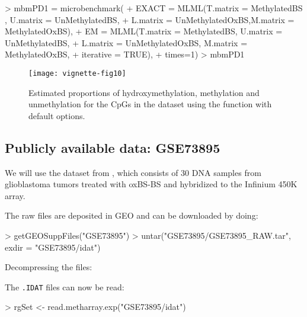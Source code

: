 \documentclass{article}
\begin{document}
\begin{Schunk}
\begin{Sinput}
> mbmPD1 = microbenchmark(
+   EXACT = MLML(T.matrix = MethylatedBS , U.matrix = UnMethylatedBS,
+                L.matrix = UnMethylatedOxBS,M.matrix = MethylatedOxBS),
+   EM = MLML(T.matrix = MethylatedBS, U.matrix = UnMethylatedBS,
+             L.matrix = UnMethylatedOxBS, M.matrix = MethylatedOxBS,
+             iterative = TRUE),
+   times=1)
> mbmPD1
\end{Sinput}
\end{Schunk}




\begin{figure*}[h]
 \texttt{[image: vignette-fig10]}
 \caption{\label{fig:fig10} Estimated proportions of hydroxymethylation, methylation and unmethylation for the CpGs in the dataset using the  function with default options.}
\end{figure*}

\subsection{Publicly available data: GSE73895}

We will use the dataset from \cite{pmid27886174}, which consists of 30 DNA samples from glioblastoma tumors treated with oxBS-BS and hybridized to the Infinium 450K array.


The raw files are deposited in GEO and can be downloaded by doing:
\begin{Schunk}
\begin{Sinput}
> getGEOSuppFiles("GSE73895")
> untar("GSE73895/GSE73895_RAW.tar", exdir = "GSE73895/idat")
\end{Sinput}
\end{Schunk}

Decompressing the files:
\begin{Schunk}
\end{Schunk}

The \verb|.IDAT| files can now be read:
\begin{Schunk}
\begin{Sinput}
> rgSet <- read.metharray.exp("GSE73895/idat")
\end{Sinput}
\end{Schunk}
\end{document}
